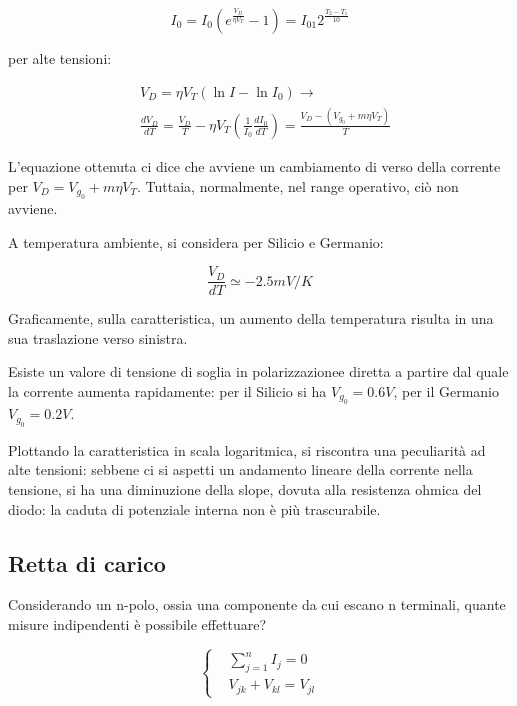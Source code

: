 \documentclass{article}
\begin{document}
\begin{equation}
    I_0=I_0(e^{\frac{V_D}{\eta V_T}}-1)=I_{01}2^{\frac{T_2-T_1}{10}}
\end{equation}

per alte tensioni:

\begin{equation}
    \begin{aligned}
         & V_D=\eta V_T (\ln{I}-\ln{I_0}) \rightarrow                                                                \\
         & \frac{d V_D}{dT}=\frac{V_D}{T}-\eta V_T(\frac{1}{I_0}\frac{d I_0}{dT})= \frac{V_D-(V_{g_0}+m\eta V_T)}{T}
    \end{aligned}
\end{equation}

L'equazione ottenuta ci dice che avviene un cambiamento di verso della corrente per $V_D=V_{g_0}+m\eta V_T$.
Tuttaia, normalmente, nel range operativo, ciò non avviene.

A temperatura ambiente, si considera per Silicio e Germanio:

\begin{equation}
    \frac{V_D}{dT}\simeq -2.5 mV/K
\end{equation}

Graficamente, sulla caratteristica, un aumento della temperatura risulta in una sua traslazione verso sinistra.

Esiste un valore di tensione di soglia in polarizzazionee diretta a partire dal quale la corrente aumenta rapidamente:
per il Silicio si ha $V_{g_0}=0.6V$, per il Germanio $V_{g_0}=0.2V$.

Plottando la caratteristica in scala logaritmica, si riscontra una peculiarità ad alte tensioni: sebbene ci si aspetti un andamento lineare della corrente nella tensione,
si ha una diminuzione della slope, dovuta alla resistenza ohmica del diodo: la caduta di potenziale interna non è più trascurabile.


\subsection{Retta di carico}

Considerando un n-polo, ossia una componente da cui escano n terminali, quante misure indipendenti è possibile effettuare?

\begin{equation}
    \left\{
    \begin{aligned}
         & \sum_{j=1}^{n}I_j=0  \\
         & V_{jk}+V_{kl}=V_{jl}
    \end{aligned}
    \right.
\end{equation}
\end{document}
